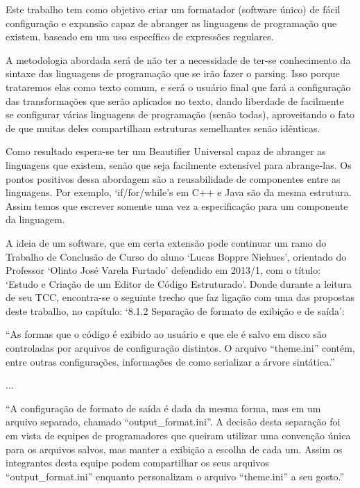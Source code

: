 \lang
{
    Este trabalho tem como objetivo criar um formatador (software único) de fácil configuração e
    expansão capaz de abranger as linguagens de programação que existem, baseado em um uso
    específico de expressões regulares.

    A metodologia abordada será de não ter a necessidade de ter-se conhecimento da sintaxe das
    linguagens de programação que se irão fazer o parsing. Isso porque trataremos elas como texto
    comum, e será o usuário final que fará a configuração das transformações que serão aplicados no
    texto, dando liberdade de facilmente se configurar várias linguagens de programação (senão
    todas), aproveitando o fato de que muitas deles compartilham estruturas semelhantes senão
    idênticas.

    Como resultado espera-se ter um Beautifier Universal capaz de abranger as linguagens que
    existem, senão que seja facilmente extensível para abrange-las. Os pontos positivos dessa
    abordagem são a reusabilidade de componentes entre as linguagens. Por exemplo, `if/for/while's
    em C++ e Java são da mesma estrutura. Assim temos que escrever somente uma vez a especificação
    para um componente da linguagem.

    A ideia de um software, que em certa extensão pode continuar um ramo do Trabalho de Conclusão de
    Curso do aluno `Lucas Boppre Niehues', orientado do Professor `Olinto José Varela Furtado'
    defendido em 2013/1, com o título: `Estudo e Criação de um Editor de Código Estruturado'. Donde
    durante a leitura de seu TCC, encontra-se o seguinte trecho que faz ligação com uma das
    propostas deste trabalho, no capítulo: `8.1.2 Separação de formato de exibição e de saída':

    \medskip
    \begin{myquote}
    ``As formas que o código é exibido ao usuário e que ele é salvo em disco são controladas
    por arquivos de configuração distintos. O arquivo ``theme.ini'' contém, entre outras
    configurações, informações de como serializar a árvore sintática.''
    \end{myquote}

    \vspace{-5mm}
    ...
    \begin{myquote}
    ``A configuração de formato de saída é dada da mesma forma, mas em um arquivo
    separado, chamado ``output\_format.ini''. A decisão desta separação foi em vista de equipes
    de programadores que queiram utilizar uma convenção única para os arquivos salvos,
    mas manter a exibição a escolha de cada um. Assim os integrantes desta equipe podem
    compartilhar os seus arquivos ``output\_format.ini'' enquanto personalizam o arquivo
    ``theme.ini'' a seu gosto.''
    \end{myquote}

}
